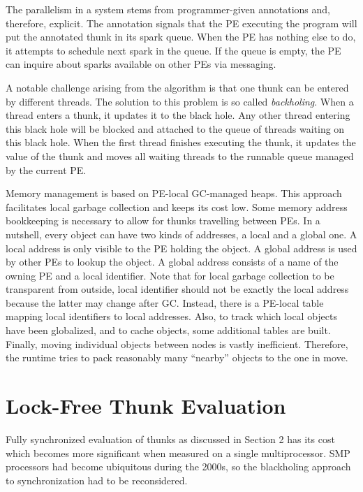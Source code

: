 \documentclass[11pt]{extarticle}
\begin{document}
The parallelism in a system stems from programmer-given annotations and, therefore, explicit. The annotation signals that the PE executing the program will put the annotated thunk in its spark queue. When the PE has nothing else to do, it attempts to schedule next spark in the queue. If the queue is empty, the PE can inquire about sparks available on other PEs via messaging.

A notable challenge arising from the algorithm is that one thunk can be entered by different threads. The solution to this problem is so called \emph{backholing}. When a thread enters a thunk, it updates it to the black hole. Any other thread entering this black hole will be blocked and attached to the queue of threads waiting on this black hole. When the first thread finishes executing the thunk, it updates the value of the thunk and moves all waiting threads to the runnable queue managed by the current PE.

Memory management is based on PE-local GC-managed heaps. This approach facilitates local garbage collection and keeps its cost low. Some memory address bookkeeping is necessary to allow for thunks travelling between PEs. In a nutshell, every object can have two kinds of addresses, a local and a global one. A local address is only visible to the PE holding the object. A global address is used by other PEs to lookup the object. A global address consists of a name of the owning PE and a local identifier. Note that for local garbage collection to be transparent from outside, local identifier should not be exactly the local address because the latter may change after GC. Instead, there is a PE-local table mapping local identifiers to local addresses. Also, to track which local objects have been globalized, and to cache objects, some additional tables are built. Finally, moving individual objects between nodes is vastly inefficient. Therefore, the runtime tries to pack reasonably many ``nearby'' objects to the one in move.

\section{Lock-Free Thunk Evaluation}

Fully synchronized evaluation of thunks as discussed in Section 2 has its cost which becomes more significant when measured on a single multiprocessor. SMP processors had become ubiquitous during the 2000s, so the blackholing approach to synchronization had to be reconsidered.
\end{document}
